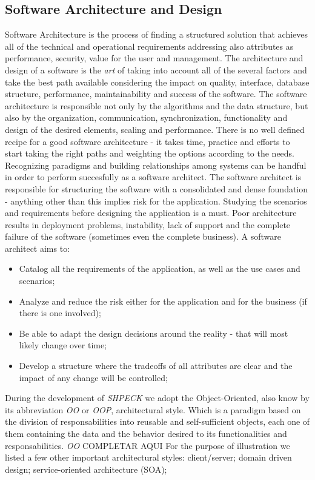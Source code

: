 \documentclass[ppgc,mestrado,english]{iiufrgs}
\begin{document}
\subsection{Software Architecture and Design}
Software Architecture is the process of finding a structured solution that achieves all of the technical and operational requirements addressing also attributes as performance, security, value for the user and management. The architecture and design of a software is the \emph{art} of taking into account all of the several factors and take the best path available considering the impact on quality, interface, database structure, performance, maintainability and success of the software.
The software architecture is responsible not only by the algorithms and the data structure, but also by the organization, communication, synchronization, functionality and design of the desired elements, scaling and performance. There is no well defined recipe for a good software architecture - it takes time, practice and efforts to start taking the right paths and weighting the options according to the needs. Recognizing paradigms and building relationships among systems can be handful in order to perform succesfully as a software architect.
The software architect is responsible for structuring the software with a consolidated and dense foundation - anything other than this implies risk for the application. Studying the scenarios and requirements before designing the application is a must. Poor architecture results in deployment problems, instability, lack of support and the complete failure of the software (sometimes even the complete business).
A software architect aims to: 
\begin{itemize}
\item Catalog all the requirements of the application, as well as the use cases and scenarios;
\item Analyze and reduce the risk either for the application and for the business (if there is one involved);
\item Be able to adapt the design decisions around the reality - that will most likely change over time;
\item Develop a structure where the tradeoffs of all attributes are clear and the impact of any change will be controlled;
\end{itemize}

During the development of \emph{SHPECK} we adopt the Object-Oriented, also know by its abbreviation \emph{OO} or \emph{OOP}, architectural style. Which is a paradigm based on the division of responsabilities into reusable and self-sufficient objects, each one of them containing the data and the behavior desired to its functionalities and responsabilities. \emph{OO} COMPLETAR AQUI
For the purpose of illustration we listed a few other important architectural styles: client/server; domain driven design; service-oriented architecture (SOA); 
\end{document}
